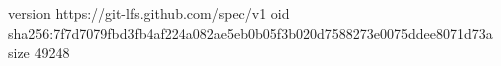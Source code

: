 version https://git-lfs.github.com/spec/v1
oid sha256:7f7d7079fbd3fb4af224a082ae5eb0b05f3b020d7588273e0075ddee8071d73a
size 49248
